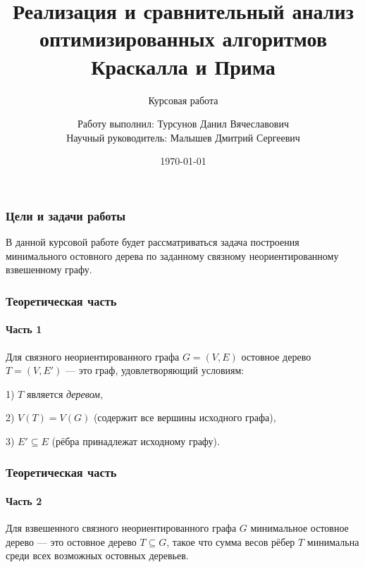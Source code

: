 \documentclass[aspectratio=169]{beamer}
\title[Заголовок]{Реализация и сравнительный анализ оптимизированных алгоритмов Краскалла и Прима}
\subtitle{Курсовая работа}
\author[Имя автора]{Работу выполнил: Турсунов Данил Вячеславович \\ Научный руководитель: Малышев Дмитрий Сергеевич}
\institute{Образовательная программа "Фундаментальная математика"}
\date{\today}
\begin{document}

\frame[plain]{\titlepage}	%

\begin{frame}
\frametitle{Цели и задачи работы}
	\hspace{0.5cm} В данной курсовой работе будет рассматриваться задача построения минимального остовного дерева по заданному связному неориентированному взвешенному графу.
\end{frame}

\begin{frame}
	\frametitle{Теоретическая часть}
	\framesubtitle{Часть 1}
	\begin{definition}
		Для связного неориентированного графа \( G = (V, E) \) остовное дерево \( T = (V, E') \) --- это граф, удовлетворяющий условиям:
		\par 1) \( T \) является \textit{деревом},
		\par 2) \( V(T) = V(G) \) (содержит все вершины исходного графа),
		\par 3) \( E' \subseteq E \) (рёбра принадлежат исходному графу).
	\end{definition}
\end{frame}

\begin{frame}
	\frametitle{Теоретическая часть}
	\framesubtitle{Часть 2}
	\begin{definition}
		Для взвешенного связного неориентированного графа $G$ минимальное остовное дерево --- это остовное дерево $T \subseteq G$, такое что сумма весов рёбер $T$ минимальна среди всех возможных остовных деревьев.
	\end{definition}
\end{frame}
\end{document}
